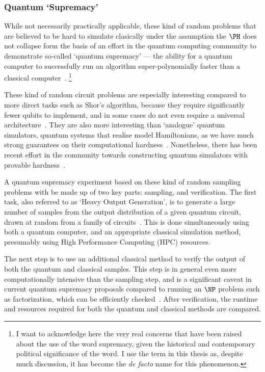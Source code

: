 \subsubsection*{Quantum `Supremacy'}
While not necessarily practically applicable, these kind of random problems that are believed to be hard to simulate clasically under the assumption the $\PH$ does not collapse form the basis of an effort in the quantum computing community to demonstrate so-called `quantum supremacy' --- the ability for a quantum computer to successfully run an algorithm super-polynomially faster than a classical computer~\cite{Preskill2012}.
\footnote{I want to acknowledge here the very real concerns that have been raised about the use of the word supremacy, given the historical and contemporary political significance of the word. I use the term in this thesis as, despite much discussion, it has become the \emph{de facto} name for this phenomenon.}
\par
These kind of random circuit problems are especially interesting compared to more direct tasks such as Shor's algorithm, because they require significantly fewer qubits to implement, and in some cases do not even require a universal architecture~\cite{Montanaro2017}. They are also more interesting than `analogue' quantum simulators, quantum systems that realise model Hamiltonians, as we have much strong guarantees on their computational hardness~\cite{Montanaro2017}. Nonetheless, there has been recent effort in the community towards constructing quantum simulators with provable hardness~\cite{Gao2017,BermejoVega2018,Hangleiter2017,Haferkamp2019}.\par
A quantum supremacy experiment based on these kind of random sampling problems with be made up of two key parts: sampling, and verification. The first task, also referred to as `Heavy Output Generation', is to generate a large number of samples from the output distribution of a given quantum circuit, drawn at random from a family of circuits~\cite{Aaronson2016}. This is done simultaneously using both a quantum computer, and an appropriate classical simulation method, presumably using High Performance Computing (HPC) resources.\par
The next step is to use an additional classical method to verify the output of both the quantum and classical samples. This step is in general even more computationally intensive than the sampling step, and is a significant caveat in current quantum supremacy proposals compared to running an $\NP$ problem such as factorization, which can be efficiently checked~\cite{Harrow2017}. After verification, the runtime and resources required for both the quantum and classical methods are compared.\par
